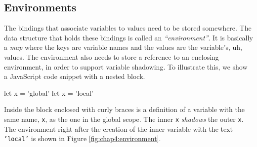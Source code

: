 \subsection{Environments}
The bindings that associate variables to values need to be stored somewhere. The data structure that holds these bindings is called an \emph{``environment''}.
It is basically a \emph{map} where the keys are variable names and the values are the variable’s, uh, values. The environment also needs to store a reference
to an enclosing environment, in order to support variable shadowing. To illustrate this, we show a JavaScript code snippet with a nested block.
\begin{code}
let x = 'global'
{
    let x = 'local'
}
\end{code}
Inside the block enclosed with curly braces is a definition of a variable with the same name, \texttt{x}, as the one in the global scope. The inner \texttt{x}
\emph{shadows} the outer \texttt{x}. The environment right after the creation of the inner variable with the text \texttt{'local'} is shown in Figure
\ref{fig:chap4:environment}.

